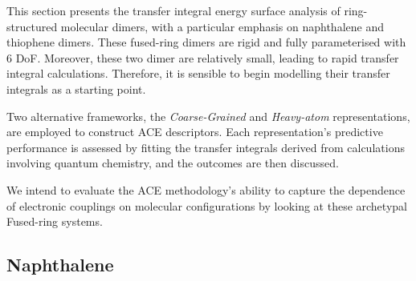This section presents the transfer integral energy surface analysis of ring-structured molecular dimers, with a particular emphasis on naphthalene and thiophene dimers. These fused-ring dimers are rigid and fully parameterised with 6 DoF. Moreover, these two dimer are relatively small, leading to rapid transfer integral calculations. Therefore, it is sensible to begin modelling their transfer integrals as a starting point.

Two alternative frameworks, the \textit{Coarse-Grained} and \textit{Heavy-atom} representations, are employed to construct ACE descriptors. 
Each representation's predictive performance is assessed by fitting the transfer integrals derived from calculations involving quantum chemistry, and the outcomes are then discussed.

We intend to evaluate the ACE methodology's ability to capture the dependence of electronic couplings on molecular configurations by looking at these archetypal Fused-ring systems.

\subsection{Naphthalene} \label{sec:4.2.1}
